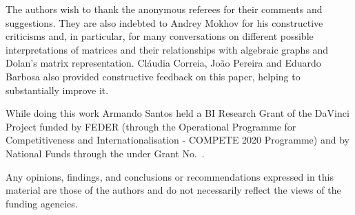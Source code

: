 \documentclass[sigplan,screen]{acmart}\settopmatter{}
\begin{document}
\begin{acks} %

The authors wish to thank the anonymous referees for their comments and suggestions. They are also indebted to Andrey Mokhov for his constructive criticisms and, in particular, for many conversations on different possible interpretations of matrices and their relationships with algebraic graphs and Dolan's matrix representation.
Cláudia Correia, João Pereira and Eduardo Barbosa also provided constructive feedback on this paper, helping to substantially improve it. %

While doing this work Armando Santos held a BI Research Grant of the DaVinci Project funded by FEDER (through the Operational Programme for Competitiveness and Internationalisation - COMPETE 2020 Programme) and by National Funds through the
under Grant No.~.

Any opinions, findings, and conclusions or recommendations expressed in this material are those of the authors and do not necessarily reflect the views of the funding agencies.
\end{acks}



\end{document}
